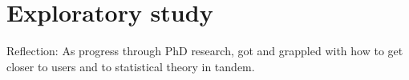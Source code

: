\section{Exploratory study}

Reflection: As progress through PhD research, got and grappled with how to get closer to users and to statistical theory in tandem.